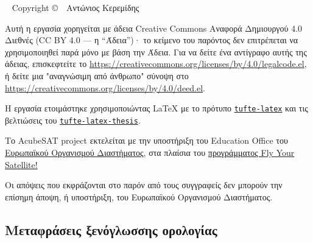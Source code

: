 \documentclass[a4paper,nobib,justified]{tufte-book}
\begin{document}
\newpage
\begin{fullwidth}
~\vfill
\thispagestyle{empty}
\setlength{\parindent}{0pt}
\setlength{\parskip}{\baselineskip}
Copyright \copyright\ \the\year\ Αντώνιος Κερεμίδης

\par{}

\justify

\par Αυτή η εργασία χορηγείται με άδεια Creative Commons Αναφορά Δημιουργού 4.0 Διεθνές (CC BY 4.0 --- η ``Άδεια'')· το κείμενο του παρόντος δεν επιτρέπεται να χρησιμοποιηθεί παρά μόνο με βάση την Άδεια. Για να δείτε ένα αντίγραφο αυτής της άδειας, επισκεφτείτε το
\url{https://creativecommons.org/licenses/by/4.0/legalcode.el}, ή δείτε μια "αναγνώσιμη από άνθρωπο" σύνοψη στο \url{https://creativecommons.org/licenses/by/4.0/deed.el}.

\par Η εργασία ετοιμάστηκε χρησιμοποιώντας \LaTeX{} με το πρότυπο \href{https://ctan.org/pkg/tufte-latex?lang=en}{\texttt{tufte-latex}} και τις βελτιώσεις του \href{https://github.com/lalider/tufte-latex-thesis}{\texttt{tufte-latex-thesis}}.

\par Το AcubeSAT project εκτελείται με την υποστήριξη του Education Office του \href{https://www.esa.int/}{Ευρωπαϊκού Οργανισμού Διαστήματος}, στα πλαίσια του \href{https://www.esa.int/Education/CubeSats_-_Fly_Your_Satellite/}{προγράμματος Fly Your Satellite!}

\par Οι απόψεις που εκφράζονται στο παρόν από τους συγγραφείς δεν μπορούν  την επίσημη άποψη, ή υποστήριξη, του Ευρωπαϊκού Οργανισμού Διαστήματος.

\end{fullwidth}

\tableofcontents

\begin{fullwidth}
\listoffigures

\listoftables

\chapter*{Μεταφράσεις ξενόγλωσσης ορολογίας}

\bgroup
\setlength\parskip{.8ex}
\egroup

\bgroup
\setlength\parskip{1ex}
\egroup

\end{fullwidth}
\end{document}
